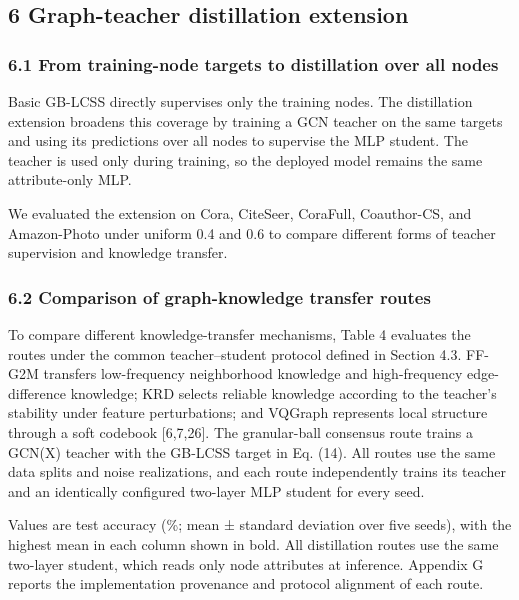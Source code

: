\subsection{6 Graph-teacher distillation extension}\label{graph-teacher-distillation-extension}

\subsubsection{6.1 From training-node targets to distillation over all nodes}\label{from-training-node-targets-to-distillation-over-all-nodes}

Basic GB-LCSS directly supervises only the training nodes. The distillation extension broadens this coverage by training a GCN teacher on the same targets and using its predictions over all nodes to supervise the MLP student. The teacher is used only during training, so the deployed model remains the same attribute-only MLP.

We evaluated the extension on Cora, CiteSeer, CoraFull, Coauthor-CS, and Amazon-Photo under uniform 0.4 and 0.6 to compare different forms of teacher supervision and knowledge transfer.

\subsubsection{6.2 Comparison of graph-knowledge transfer routes}\label{comparison-of-graph-knowledge-transfer-routes}

To compare different knowledge-transfer mechanisms, Table 4 evaluates the routes under the common teacher--student protocol defined in Section 4.3. FF-G2M transfers low-frequency neighborhood knowledge and high-frequency edge-difference knowledge; KRD selects reliable knowledge according to the teacher's stability under feature perturbations; and VQGraph represents local structure through a soft codebook {[}6,7,26{]}. The granular-ball consensus route trains a GCN(X) teacher with the GB-LCSS target in Eq. (14). All routes use the same data splits and noise realizations, and each route independently trains its teacher and an identically configured two-layer MLP student for every seed.

Values are test accuracy (\%; mean ± standard deviation over five seeds), with the highest mean in each column shown in bold. All distillation routes use the same two-layer student, which reads only node attributes at inference. Appendix G reports the implementation provenance and protocol alignment of each route.

